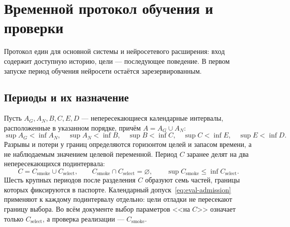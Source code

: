 \documentclass[12pt,a4paper]{article}
\theoremstyle{plainru}
\begin{document}
\section{Временной протокол обучения и проверки}\label{sec:eval-temporal}

Протокол един для основной системы и нейросетевого расширения:
вход содержит доступную историю, цели --- последующее поведение.
В первом запуске период обучения нейросети остаётся зарезервированным.

\subsection{Периоды и их назначение}\label{sec:eval-periods}

Пусть $A_G,A_N,B,C,E,D$ --- непересекающиеся календарные интервалы,
расположенные в указанном порядке, причём $A=A_G\cup A_N$:
\begin{equation}\label{eq:eval-period-order}
\sup A_G<\inf A_N,\quad \sup A_N<\inf B,\quad
\sup B<\inf C,\quad \sup C<\inf E,\quad \sup E<\inf D.
\end{equation}
Разрывы и потери у границ определяются горизонтом целей и запасом времени,
а не наблюдаемым значением целевой переменной.
Период $C$ заранее делят на два непересекающихся подинтервала:
\begin{equation}\label{eq:eval-validation-split}
C=C_{\mathrm{smoke}}\cup C_{\mathrm{select}},\qquad
C_{\mathrm{smoke}}\cap C_{\mathrm{select}}=\varnothing,\qquad
\sup C_{\mathrm{smoke}}\le\inf C_{\mathrm{select}}.
\end{equation}
Шесть крупных периодов после разделения $C$ образуют семь частей,
границы которых фиксируются в паспорте.
Календарный допуск~\eqref{eq:eval-admission} применяют к каждому
подинтервалу отдельно: цели отладки не пересекают границу выбора.
Во всём документе выбор параметров <<на $C$>> означает только
$C_{\mathrm{select}}$, а проверка реализации --- $C_{\mathrm{smoke}}$.
\end{document}
